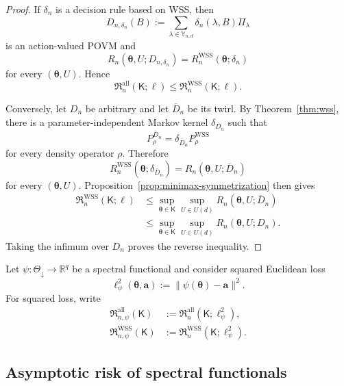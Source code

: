 \documentclass{article}
\newtheorem{remark}{Remark}
\theoremstyle{named}
\theoremstyle{named1}
\newcommand{\R}{\mathbb{R}}
\newcommand{\WSS}{\mathrm{WSS}}
\newcommand{\btheta}{\boldsymbol{\theta}}
\newcommand{\ba}{\boldsymbol{a}}
\theoremstyle{plain}
\theoremstyle{remark}
\begin{document}
\begin{proof}
If \(\delta_n\) is a decision rule based on WSS, then
\[
    D_{n,\delta_n}(B)
    :=\sum_{\lambda\in\mathbb Y_{n,d}}
      \delta_n(\lambda,B)\Pi_\lambda
\]
is an action-valued POVM and
\[
    R_n(\btheta,U;D_{n,\delta_n})
    =R_n^{\WSS}(\btheta;\delta_n)
\]
for every \((\btheta,U)\). Hence
\[
    \mathfrak R_n^{\mathrm{all}}(\mathsf K;\ell)
    \leq\mathfrak R_n^{\WSS}(\mathsf K;\ell).
\]

Conversely, let \(D_n\) be arbitrary and let \(\overline D_n\) be its
twirl. By Theorem~\ref{thm:wss}, there is a parameter-independent
Markov kernel \(\delta_{\overline D_n}\) such that
\[
    P_\rho^{\overline D_n}
    =\delta_{\overline D_n}P_\rho^{\WSS}
\]
for every density operator \(\rho\). Therefore
\[
    R_n^{\WSS}(\btheta;\delta_{\overline D_n})
    =R_n(\btheta,U;\overline D_n)
\]
for every \((\btheta,U)\). Proposition~\ref{prop:minimax-symmetrization}
then gives
\[
\begin{aligned}
    \mathfrak R_n^{\WSS}(\mathsf K;\ell)
    &\leq
    \sup_{\btheta\in\mathsf K}\sup_{U\in U(d)}
      R_n(\btheta,U;\overline D_n)\\
    &\leq
    \sup_{\btheta\in\mathsf K}\sup_{U\in U(d)}
      R_n(\btheta,U;D_n).
\end{aligned}
\]
Taking the infimum over \(D_n\) proves the reverse inequality.
\end{proof}


Let \(\psi:\Theta_{\downarrow}\to\R^q\) be a spectral functional and
consider squared Euclidean loss
\[
    \ell^2_\psi(\btheta,\ba):=\|\psi(\btheta)-\ba\|^2.
\]
For squared loss, write
\[
\begin{aligned}
\mathfrak R_{n,\psi}^{\mathrm{all}}(\mathsf K)
&:=\mathfrak R_n^{\mathrm{all}}(\mathsf K;\ell_\psi^2),\\
\mathfrak R_{n,\psi}^{\WSS}(\mathsf K)
&:=\mathfrak R_n^{\WSS}(\mathsf K;\ell_\psi^2).
\end{aligned}
\]



\subsection{Asymptotic risk of spectral functionals}
\end{document}
